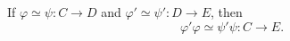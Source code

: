 If $\varphi \simeq \psi : C \to D$ and $\varphi' \simeq \psi' : D \to E$, then
$$\varphi' \varphi \simeq \psi' \psi : C \to E.$$